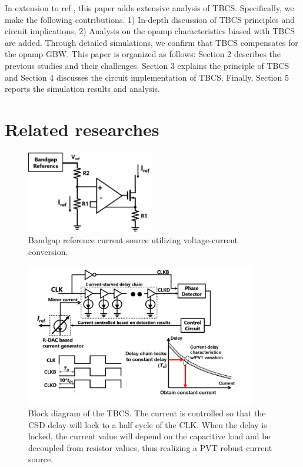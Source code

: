 \documentclass[letterpaper, 10 pt, conference]{ieeeconf}  %
\begin{document}
In extension to ref.\cite{yoshioka201728, yoshioka2019digital}, this paper adds extensive analysis of TBCS. Specifically, we make the following contributions. 1) In-depth discussion of TBCS principles and circuit implications, 2) Analysis on the opamp characteristics biased with TBCS are added. Through detailed simulations, we confirm that TBCS compensates for the opamp GBW. 
This paper is organized as follows: Section 2 describes the previous studies and their challenges. Section 3 explains the principle of TBCS and Section 4 discusses the circuit implementation of TBCS. Finally, Section 5 reports the simulation results and analysis.

\section{Related researches}
\begin{figure}[!]
\centering
 \includegraphics[width=0.5\textwidth]{figs/fig1.png}
  \caption{Bandgap reference current source utilizing voltage-current conversion.}
\label{bandgap}
\end{figure}

\begin{figure}[!]
\centering
 \includegraphics[width=0.9\textwidth]{figs/fig2.png}
  \caption{Block diagram of the TBCS. The current is controlled so that the CSD delay will lock to a half cycle of the CLK. When the delay is locked, the current value will depend on the capacitive load and be decoupled from resistor values, thus realizing a PVT robust current source.}
  \label{fig2}
\end{figure}
\end{document}
